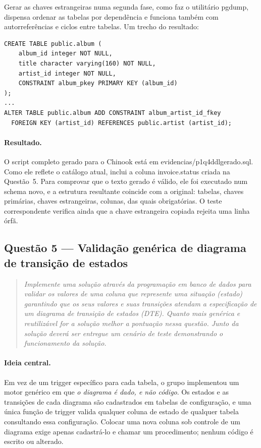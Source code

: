 \documentclass[11pt,a4paper]{article}
\newcommand{\cod}[1]{{\ttfamily\renewcommand{\_}{\textunderscore\allowbreak}#1}}
\newenvironment{enunciado}{\begin{quote}\small\itshape}{\end{quote}}
\begin{document}
Gerar as chaves estrangeiras numa segunda fase, como faz o utilitário \cod{pg\_dump}, dispensa ordenar as tabelas
por dependência e funciona também com autorreferências e ciclos entre tabelas. Um trecho do resultado:

\begin{lstlisting}
CREATE TABLE public.album (
    album_id integer NOT NULL,
    title character varying(160) NOT NULL,
    artist_id integer NOT NULL,
    CONSTRAINT album_pkey PRIMARY KEY (album_id)
);
...
ALTER TABLE public.album ADD CONSTRAINT album_artist_id_fkey
  FOREIGN KEY (artist_id) REFERENCES public.artist (artist_id);
\end{lstlisting}

\paragraph{Resultado.} O script completo gerado para o Chinook está em \cod{evidencias/p1\_q4\_ddl\_gerado.sql}.
Como ele reflete o catálogo atual, inclui a coluna \cod{invoice.status} criada na Questão~5. Para comprovar que o
texto gerado é válido, ele foi executado num schema novo, e a estrutura resultante coincide com a original:
\numQquatroTabelas{} tabelas, \numQquatroPKs{} chaves primárias, \numQquatroFKs{} chaves estrangeiras,
\numQquatroColunas{} colunas, das quais \numQquatroNotNull{} obrigatórias. O teste correspondente verifica ainda
que a chave estrangeira copiada rejeita uma linha órfã.

\subsection{Questão 5 --- Validação genérica de diagrama de transição de estados}

\begin{enunciado}
Implemente uma solução através da programação em banco de dados para validar os valores de uma coluna que
represente uma situação (estado) garantindo que os seus valores e suas transições atendam a especificação de um
diagrama de transição de estados (DTE). Quanto mais genérica e reutilizável for a solução melhor a pontuação
nessa questão. Junto da solução deverá ser entregue um cenário de teste demonstrando o funcionamento da solução.
\end{enunciado}

\paragraph{Ideia central.} Em vez de um trigger específico para cada tabela, o grupo implementou um motor
genérico em que \emph{o diagrama é dado, e não código}. Os estados e as transições de cada diagrama são
cadastrados em tabelas de configuração, e uma única função de trigger valida qualquer coluna de estado de
qualquer tabela consultando essa configuração. Colocar uma nova coluna sob controle de um diagrama exige apenas
cadastrá-lo e chamar um procedimento; nenhum código é escrito ou alterado.
\end{document}
